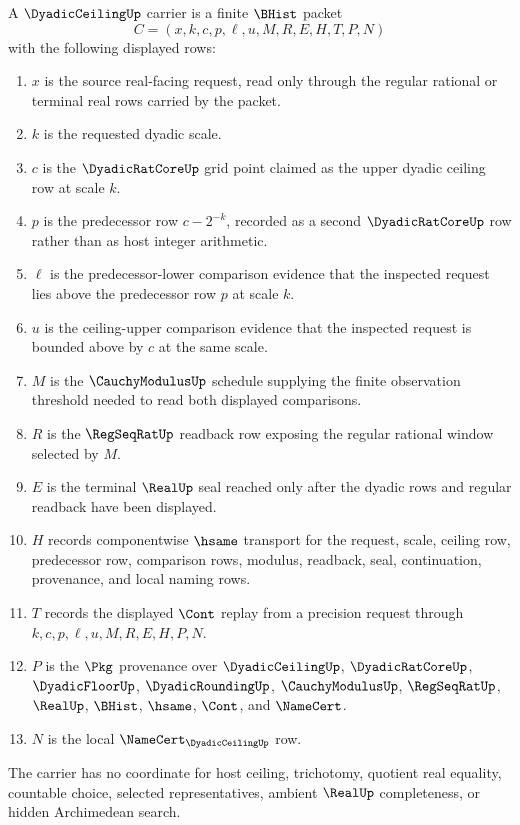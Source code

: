 \begin{definition}
\label{def:dyadic-ceiling-carrier}
A $\DyadicCeilingUp$ carrier is a finite $\BHist$ packet
$$
C=(x,k,c,p,\ell,u,M,R,E,H,T,P,N)
$$
with the following displayed rows:
\begin{enumerate}
\item $x$ is the source real-facing request, read only through the regular rational or terminal real rows carried by the packet.
\item $k$ is the requested dyadic scale.
\item $c$ is the $\DyadicRatCoreUp$ grid point claimed as the upper dyadic ceiling row at scale $k$.
\item $p$ is the predecessor row $c-2^{-k}$, recorded as a second $\DyadicRatCoreUp$ row rather than as host integer arithmetic.
\item $\ell$ is the predecessor-lower comparison evidence that the inspected request lies above the predecessor row $p$ at scale $k$.
\item $u$ is the ceiling-upper comparison evidence that the inspected request is bounded above by $c$ at the same scale.
\item $M$ is the $\CauchyModulusUp$ schedule supplying the finite observation threshold needed to read both displayed comparisons.
\item $R$ is the $\RegSeqRatUp$ readback row exposing the regular rational window selected by $M$.
\item $E$ is the terminal $\RealUp$ seal reached only after the dyadic rows and regular readback have been displayed.
\item $H$ records componentwise $\hsame$ transport for the request, scale, ceiling row, predecessor row, comparison rows, modulus, readback, seal, continuation, provenance, and local naming rows.
\item $T$ records the displayed $\Cont$ replay from a precision request through $k,c,p,\ell,u,M,R,E,H,P,N$.
\item $P$ is the $\Pkg$ provenance over $\DyadicCeilingUp$, $\DyadicRatCoreUp$, $\DyadicFloorUp$, $\DyadicRoundingUp$, $\CauchyModulusUp$, $\RegSeqRatUp$, $\RealUp$, $\BHist$, $\hsame$, $\Cont$, and $\NameCert$.
\item $N$ is the local $\NameCert_{\DyadicCeilingUp}$ row.
\end{enumerate}
The carrier has no coordinate for host ceiling, trichotomy, quotient real equality, countable choice, selected representatives, ambient $\RealUp$ completeness, or hidden Archimedean search.
\end{definition}

